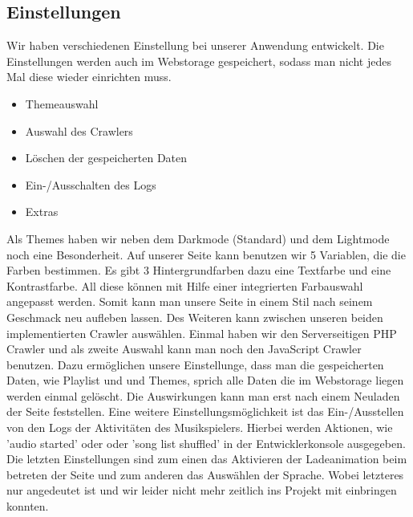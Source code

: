 \documentclass{article}
\begin{document}
\subsection{Einstellungen}
Wir haben verschiedenen Einstellung bei unserer Anwendung entwickelt. Die Einstellungen werden auch im Webstorage gespeichert, sodass man nicht jedes Mal diese wieder einrichten muss.
\begin{itemize}
    \item Themeauswahl
    \item Auswahl des Crawlers
    \item Löschen der gespeicherten Daten
    \item Ein-/Ausschalten des Logs
    \item Extras
\end{itemize}
Als Themes haben wir neben dem Darkmode (Standard) und dem Lightmode noch eine Besonderheit. Auf unserer Seite kann benutzen wir 5 Variablen, die die Farben bestimmen. Es gibt 3 Hintergrundfarben dazu eine Textfarbe und eine Kontrastfarbe. All diese können mit Hilfe einer integrierten Farbauswahl angepasst werden. Somit kann man unsere Seite in einem Stil nach seinem Geschmack neu aufleben lassen.\newline
Des Weiteren kann zwischen unseren beiden implementierten Crawler auswählen. Einmal haben wir den Serverseitigen PHP Crawler und als zweite Auswahl kann man noch den JavaScript Crawler benutzen.\newline
Dazu ermöglichen unsere Einstellunge, dass man die gespeicherten Daten, wie Playlist und und Themes, sprich alle Daten die im Webstorage liegen werden einmal gelöscht. Die Auswirkungen kann man erst nach einem Neuladen der Seite feststellen.\newline
Eine weitere Einstellungsmöglichkeit ist das Ein-/Ausstellen von den Logs der Aktivitäten des Musikspielers. Hierbei werden Aktionen, wie 'audio started' oder oder 'song list shuffled' in der Entwicklerkonsole ausgegeben.\newline
Die letzten Einstellungen sind zum einen das Aktivieren der Ladeanimation beim betreten der Seite und zum anderen das Auswählen der Sprache. Wobei letzteres nur angedeutet ist und wir leider nicht mehr zeitlich ins Projekt mit einbringen konnten.
\end{document}
